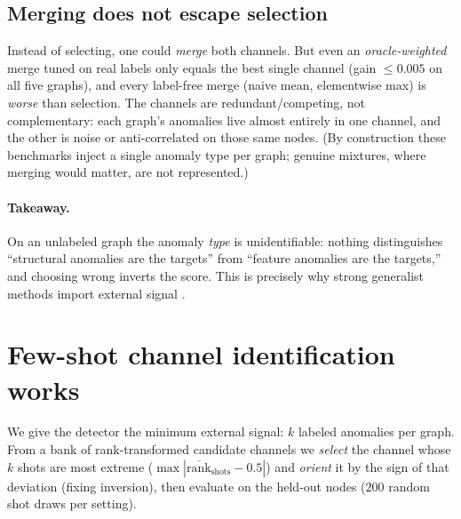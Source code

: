 \documentclass[11pt]{article}
\begin{document}
\subsection{Merging does not escape selection}
Instead of selecting, one could \emph{merge} both channels. But even an \emph{oracle-weighted}
merge tuned on real labels only equals the best single channel (gain $\le 0.005$ on all five
graphs), and every label-free merge (naive mean, elementwise max) is \emph{worse} than
selection. The channels are redundant/competing, not complementary: each graph's anomalies live
almost entirely in one channel, and the other is noise or anti-correlated on those same nodes.
(By construction these benchmarks inject a single anomaly type per graph; genuine mixtures,
where merging would matter, are not represented.)

\paragraph{Takeaway.} On an unlabeled graph the anomaly \emph{type} is unidentifiable: nothing
distinguishes ``structural anomalies are the targets'' from ``feature anomalies are the
targets,'' and choosing wrong inverts the score. This is precisely why strong generalist
methods import external signal \citep{liu2024arc,niu2024unprompt,qiao2025anomalygfm}.

\section{Few-shot channel identification works}
\label{sec:fewshot}

We give the detector the minimum external signal: $k$ labeled anomalies per graph. From a bank
of rank-transformed candidate channels we \emph{select} the channel whose $k$ shots are most
extreme ($\max |\overline{\text{rank}}_{\text{shots}} - 0.5|$) and \emph{orient} it by the sign
of that deviation (fixing inversion), then evaluate on the held-out nodes ($200$ random shot
draws per setting).
\end{document}
